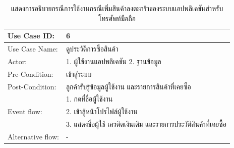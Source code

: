 \begin{table}[htbp]
  \centering
  \caption{แสดงการอธิบายกรณีการใช้งานกรณีเพิ่มสินค้าลงตะกร้าของระบบแอปพลิเคชันสำหรับโทรศัพท์มือถือ}
  \label{tab:example}
  \begin{tabularx}{\textwidth}{|p{3cm}|X|}
    \hline
    \multirow{1}{3cm}{Use Case ID:}      & 6                                     \\
    \hline
    \multirow{1}{3cm}{Use Case Name:}    & ดูประวัติการซื้อสินค้า                       \\
    \hline
    \multirow{1}{3cm}{Actor:}            & 1. ผู้ใช้งานแอปพลิเคชัน 2. ฐานข้อมูล         \\
    \hline
    \multirow{1}{3cm}{Pre-Condition:}    & เข้าสู่ระบบ                              \\
    \hline
    \multirow{1}{3cm}{Post-Condition:}   & ลูกค้ารับรู้ข้อมูลผู้ใช้งาน และรายการสินค้าที่เคยซื้อ \\
    \hline
    \multirow{3}{3cm}{Event flow:}       & 1. กดที่ชื่อผู้ใช้งาน                        \\
                                         & 2. เข้าสู้หน้าโปรไฟล์ผู้ใช้งาน                \\ & 3. แสดงชื่อผู้ใช้ เครดิตเงินเติม และรายการประวัติสินค้าที่เคยซื้อ \\
    \hline
    \multirow{1}{3cm}{Alternative flow:} & -                                     \\
    \hline
  \end{tabularx}
\end{table}

